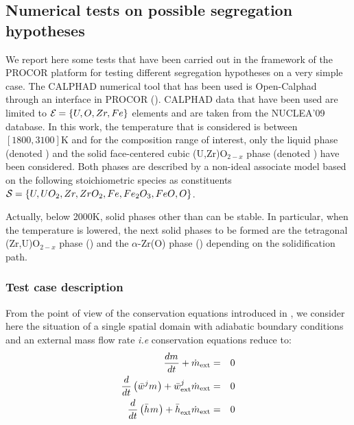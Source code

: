 \subsection{Numerical tests on possible segregation hypotheses} \label{sect:num}

We report here some tests that have been carried out in the framework of the PROCOR platform for testing different segregation hypotheses on a very simple case. The CALPHAD numerical tool that has been used is Open-Calphad through an interface in PROCOR (\cite{Sundman2016}). CALPHAD data that have been used are limited to $\elementSet = \left\{U,O,Zr,Fe\right\}$ elements and are taken from the NUCLEA'09 database. In this work, the temperature that is considered is between $[1800, 3100]$K and for the composition range of interest, only the liquid phase (denoted ) and the solid face-centered cubic (U,Zr)O$_{2-x}$ phase (denoted ) have been considered. Both phases are described by a non-ideal associate model based on the following stoichiometric species as constituents $\speciesSet = \left\{ U, UO_2, Zr, ZrO_2, Fe, Fe_2O_3, FeO, O \right\}$.

\begin{remark}{} 
Actually, below 2000K, solid phases other than  can be stable. In particular, when the temperature is lowered, the next solid phases to be formed are the tetragonal (Zr,U)O$_{2-x}$ phase () and the $\alpha$-Zr(O) phase () depending on the solidification path.
\end{remark}

\subsubsection{Test case description}

From the point of view of the conservation equations introduced in , we consider here the situation of a single spatial domain with adiabatic boundary conditions and an external mass flow rate \textit{i.e} conservation equations reduce to:
\begin{eqnarray}
 \frac{d\mass{}}{dt} + \dot{m}_{\textrm{ext}} &=& 0 \label{eq:bulk_m1}\\
 \frac{d}{dt} \left( \avMassFraction[j]{} \mass{} \right) + \avMassFraction[j]{\textrm{ext}} \dot{m}_{\textrm{ext}} &=& 0 \label{eq:bulk_w1} \\
 \frac{d}{dt} \left( \avMassEnthalpy{} \mass{} \right) + \avMassEnthalpy{\textrm{ext}} \dot{m}_{\textrm{ext}} &=& 0  \label{eq:bulk_h1}
\end{eqnarray}

